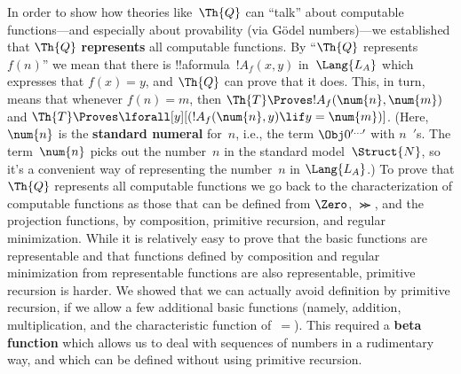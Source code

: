 In order to show how theories like~$\Th{Q}$ can ``talk'' about
computable functions---and especially about provability (via G\"odel
numbers)---we established that $\Th{Q}$ \textbf{represents} all
computable functions. By ``$\Th{Q}$ represents $f(n)$'' we mean that
there is !!a{formula}~$!A_f(x, y)$ in~$\Lang{L_A}$ which expresses
that $f(x) = y$, and $\Th{Q}$ can prove that it does.  This, in turn,
means that whenever $f(n) = m$, then $\Th{T} \Proves !A_f(\num{n},
\num{m})$ and $\Th{T} \Proves \lforall[y][(!A_f(\num{n}, y) \lif y =
\num{m})]$. (Here, $\num{n}$ is the \textbf{standard numeral} for~$n$,
i.e., the term $\Obj 0^{\prime\dots\prime}$ with $n$~$\prime$s. The
term~$\num{n}$ picks out the number~$n$ in the standard
model~$\Struct{N}$, so it's a convenient way of representing the
number~$n$ in $\Lang{L_A}$.) To prove that $\Th{Q}$ represents all
computable functions we go back to the characterization of computable
functions as those that can be defined from $\Zero$, $\Succ$, and the
projection functions, by composition, primitive recursion, and regular
minimization. While it is relatively easy to prove that the basic
functions are representable and that functions defined by composition
and regular minimization from representable functions are also
representable, primitive recursion is harder. We showed that we can
actually avoid definition by primitive recursion, if we allow a few
additional basic functions (namely, addition, multiplication, and the
characteristic function of~$=$). This required a \textbf{beta
function} which allows us to deal with sequences of numbers in a
rudimentary way, and which can be defined without using primitive
recursion.
